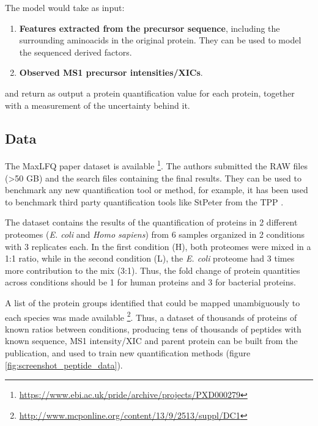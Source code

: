 \documentclass[11pt, a4paper]{report}
\begin{document}
The model would take as input:

\begin{enumerate}

\item \textbf{Features extracted from the precursor sequence}, including the surrounding aminoacids in the original protein. They can be used to model the sequenced derived factors.

\item \textbf{Observed \ac{MS1} precursor intensities/XICs}.

\end{enumerate}

and return as output a protein quantification value for each protein, together with a measurement of the uncertainty behind it.




\subsection{Data}

The MaxLFQ paper dataset is available \footnote{\href{https://www.ebi.ac.uk/pride/archive/projects/PXD000279}{https://www.ebi.ac.uk/pride/archive/projects/PXD000279}}. The authors submitted the RAW files (>50 GB) and the search files containing the final results. They can be used to benchmark any new quantification tool or method, for example, it has been used to benchmark third party quantification tools like StPeter from the TPP \cite{Hoopmann2018}.

The dataset contains the results of the quantification of proteins in 2 different proteomes (\textit{E. coli} and \textit{Homo sapiens}) from 6 samples organized in 2 conditions with 3 replicates each. In the first condition (H), both proteomes were mixed in a 1:1 ratio, while in the second condition (L), the \textit{E. coli} proteome had 3 times more contribution to the mix (3:1). Thus, the fold change of protein quantities across conditions should be 1 for human proteins and 3 for bacterial proteins.

A list of the protein groups identified that could be mapped unambiguously to each species was made available \footnote{\href{http://www.mcponline.org/content/13/9/2513/suppl/DC1}{http://www.mcponline.org/content/13/9/2513/suppl/DC1}}. Thus, a dataset of thousands of proteins of known ratios between conditions, producing tens of thousands of peptides with known sequence, \ac{MS1} intensity/XIC and parent protein can be built from the publication, and used to train new quantification methods (figure \ref{fig:screenshot_peptide_data}).
\end{document}

